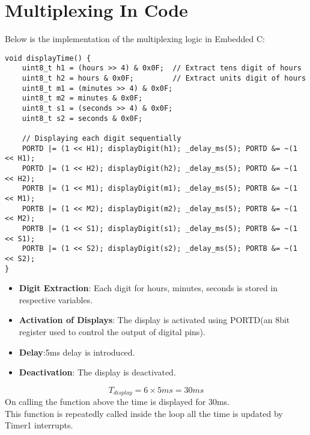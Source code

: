 \documentclass[12pt]{article}
\begin{document}
\section{Multiplexing In Code}
Below is the implementation of the multiplexing logic in Embedded C:
\begin{lstlisting}[caption={Multiplexing Logic for 7-Segment Display}, label={lst:multiplexing}]
void displayTime() {
    uint8_t h1 = (hours >> 4) & 0x0F;  // Extract tens digit of hours
    uint8_t h2 = hours & 0x0F;         // Extract units digit of hours
    uint8_t m1 = (minutes >> 4) & 0x0F;
    uint8_t m2 = minutes & 0x0F;
    uint8_t s1 = (seconds >> 4) & 0x0F;
    uint8_t s2 = seconds & 0x0F;

    // Displaying each digit sequentially
    PORTD |= (1 << H1); displayDigit(h1); _delay_ms(5); PORTD &= ~(1 << H1);
    PORTD |= (1 << H2); displayDigit(h2); _delay_ms(5); PORTD &= ~(1 << H2);
    PORTB |= (1 << M1); displayDigit(m1); _delay_ms(5); PORTB &= ~(1 << M1);
    PORTB |= (1 << M2); displayDigit(m2); _delay_ms(5); PORTB &= ~(1 << M2);
    PORTB |= (1 << S1); displayDigit(s1); _delay_ms(5); PORTB &= ~(1 << S1);
    PORTB |= (1 << S2); displayDigit(s2); _delay_ms(5); PORTB &= ~(1 << S2);
}
\end{lstlisting}
\begin{itemize}
    \item \textbf{Digit Extraction}: Each digit for hours, minutes, seconds is stored in respective variables.
    \item \textbf{Activation of Displays}: The display is activated using PORTD(an 8bit register used to control the output of digital pins).
    \item \textbf{Delay}:5ms delay is introduced.
    \item \textbf{Deactivation}: The display is deactivated.
\end{itemize}

$$T_{display}=6 \times 5ms=30ms$$
On calling the function above the time is displayed for 30ms.\\
This function is repeatedly called inside the loop all the time is updated by Timer1 interrupts.
\end{document}
